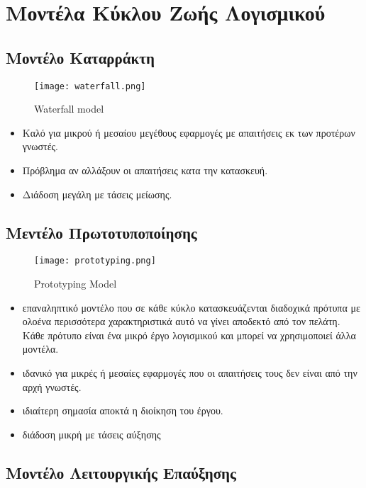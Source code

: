 \section{Μοντέλα Κύκλου Ζωής Λογισμικού}

\subsection{Μοντέλο Καταρράκτη}

\begin{figure}[H]
	\centering
	\texttt{[image: waterfall.png]}
	\caption{Waterfall model}
\end{figure}


\begin{itemize}
	\item	Καλό για μικρού ή μεσαίου μεγέθους εφαρμογές με απαιτήσεις
		εκ των προτέρων γνωστές.
	\item	Πρόβλημα αν αλλάξουν οι απαιτήσεις κατα την κατασκευή.
	\item	Διάδοση μεγάλη με τάσεις μείωσης.
\end{itemize}


\subsection{Μεντέλο Πρωτοτυποποίησης}

\begin{figure}[H]
	\centering
	\texttt{[image: prototyping.png]}
	\caption{Prototyping Model}
\end{figure}

\begin{itemize}
	\item	επαναληπτικό μοντέλο που σε κάθε κύκλο κατασκευάζενται
		διαδοχικά πρότυπα με ολοένα περισσότερα χαρακτηριστικά αυτό να γίνει 
		αποδεκτό από τον πελάτη. Κάθε πρότυπο είναι ένα μικρό έργο λογισμικού 
		και μπορεί να χρησιμοποιεί άλλα μοντέλα.
	\item	ιδανικό για μικρές ή μεσαίες εφαρμογές που οι απαιτήσεις τους δεν είναι από την 
		αρχή γνωστές.
	\item	ιδιαίτερη σημασία αποκτά η διοίκηση του έργου.
	\item	διάδοση μικρή με τάσεις αύξησης
\end{itemize}

\subsection{Μοντέλο Λειτουργικής Επαύξησης}

